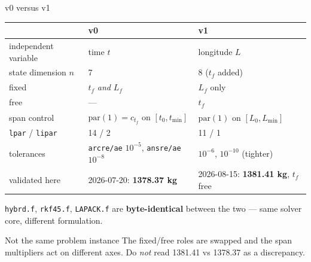 \documentclass[10pt,aspectratio=169]{beamer}
\newcommand{\code}[1]{\texttt{\small #1}}
\newcommand{\file}[1]{\texttt{\small #1}}
\newcommand{\Lf}{L_f}
\begin{document}
\begin{frame}{v0 versus v1}

\begin{center}\small
\begin{tabular}{@{}lll@{}}
\toprule
 & v0 & v1\\
\midrule
independent variable & time $t$ & longitude $L$\\
state dimension $n$ & 7 & 8 ($t_f$ added)\\
fixed & $t_f$ \emph{and} $\Lf$ & $\Lf$ only\\
free & --- & $t_f$\\
span control & $\mathrm{par}(1)=c_{t_f}$ on $[t_0,t_{\min}]$ &
$\mathrm{par}(1)$ on $[L_0,L_{\min}]$\\
\code{lpar} / \code{lipar} & 14 / 2 & 11 / 1\\
tolerances & \code{arcre/ae} $10^{-5}$, \code{ansre/ae} $10^{-8}$ &
$10^{-6}$, $10^{-10}$ (tighter)\\
validated here & 2026-07-20: \textbf{1378.37 kg} &
2026-08-15: \textbf{1381.41 kg}, $t_f$ free\\
\bottomrule
\end{tabular}
\end{center}

\file{hybrd.f}, \file{rkf45.f}, \file{LAPACK.f} are \textbf{byte-identical}
between the two --- same solver core, different formulation.

\begin{alertblock}{Not the same problem instance}
The fixed/free roles are swapped and the span multipliers act on different
axes. Do \emph{not} read 1381.41 vs 1378.37 as a discrepancy.
\end{alertblock}
\end{frame}
\end{document}
